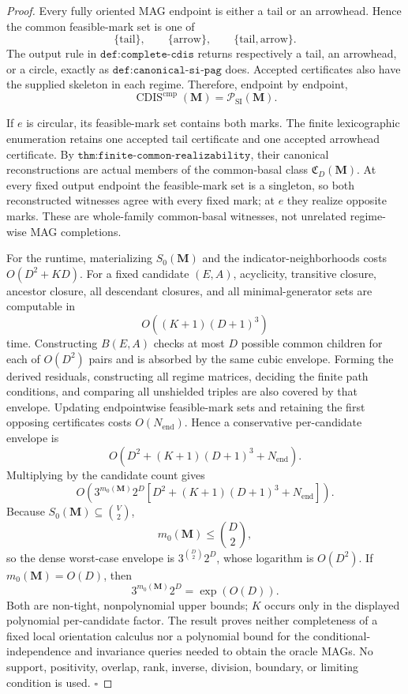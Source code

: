 \documentclass{article}
\begin{document}
\begin{proof}
Every fully oriented MAG endpoint is either a tail or an arrowhead.  Hence the common feasible-mark set is one of
\[
\{\mathrm{tail}\},
\qquad
\{\mathrm{arrow}\},
\qquad
\{\mathrm{tail},\mathrm{arrow}\}.
\]
The output rule in \(\texttt{def:complete-cdis}\) returns respectively a tail, an arrowhead, or a circle, exactly as \(\texttt{def:canonical-si-pag}\) does.  Accepted certificates also have the supplied skeleton in each regime.  Therefore, endpoint by endpoint,
\[
\operatorname{CDIS}^{\mathrm{cmp}}(\mathbf M)
=\mathcal P_{\mathrm{SI}}(\mathbf M).
\]

If \(e\) is circular, its feasible-mark set contains both marks.  The finite lexicographic enumeration retains one accepted tail certificate and one accepted arrowhead certificate.  By \(\texttt{thm:finite-common-realizability}\), their canonical reconstructions are actual members of the common-basal class \(\mathfrak C_D(\mathbf M)\).  At every fixed output endpoint the feasible-mark set is a singleton, so both reconstructed witnesses agree with every fixed mark; at \(e\) they realize opposite marks.  These are whole-family common-basal witnesses, not unrelated regime-wise MAG completions.

For the runtime, materializing \(S_0(\mathbf M)\) and the indicator-neighborhoods costs \(O(D^2+KD)\).  For a fixed candidate \((E,A)\), acyclicity, transitive closure, ancestor closure, all descendant closures, and all minimal-generator sets are computable in
\[
O((K+1)(D+1)^3)
\]
time.  Constructing \(B(E,A)\) checks at most \(D\) possible common children for each of \(O(D^2)\) pairs and is absorbed by the same cubic envelope.  Forming the derived residuals, constructing all regime matrices, deciding the finite path conditions, and comparing all unshielded triples are also covered by that envelope.  Updating endpointwise feasible-mark sets and retaining the first opposing certificates costs \(O(N_{\mathrm{end}})\).  Hence a conservative per-candidate envelope is
\[
O\!\left(D^2+(K+1)(D+1)^3+N_{\mathrm{end}}\right).
\]
Multiplying by the candidate count gives
\[
O\!\left(3^{m_0(\mathbf M)}2^D
\left[D^2+(K+1)(D+1)^3+N_{\mathrm{end}}\right]\right).
\]
Because \(S_0(\mathbf M)\subseteq\binom V2\),
\[
m_0(\mathbf M)\le\binom D2,
\]
so the dense worst-case envelope is \(3^{\binom D2}2^D\), whose logarithm is \(O(D^2)\).  If \(m_0(\mathbf M)=O(D)\), then
\[
3^{m_0(\mathbf M)}2^D=\exp(O(D)).
\]
Both are non-tight, nonpolynomial upper bounds; \(K\) occurs only in the displayed polynomial per-candidate factor.  The result proves neither completeness of a fixed local orientation calculus nor a polynomial bound for the conditional-independence and invariance queries needed to obtain the oracle MAGs.  No support, positivity, overlap, rank, inverse, division, boundary, or limiting condition is used. \(\square\)
\end{proof}
\end{document}
